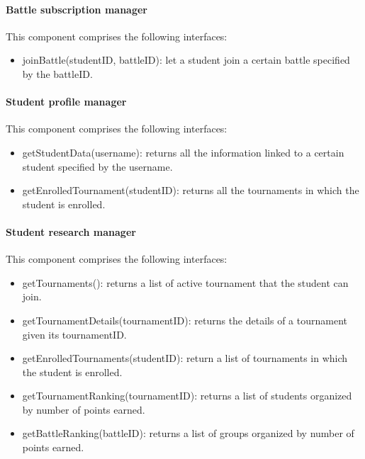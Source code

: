 \documentclass[12pt, a4paper]{report}
\begin{document}
    \paragraph*{Battle subscription manager}
    This component comprises the following interfaces: 
    \begin{itemize}
        \item joinBattle(studentID, battleID): let a student join a certain battle specified by the battleID.
    \end{itemize}

    \paragraph*{Student profile manager}
    This component comprises the following interfaces: 
    \begin{itemize}
        \item getStudentData(username): returns all the information linked to a certain student specified by the username. 
        \item getEnrolledTournament(studentID): returns all the tournaments in which the student is enrolled. 
    \end{itemize}

    \paragraph*{Student research manager}
    This component comprises the following interfaces: 
    \begin{itemize}
        \item getTournaments(): returns a list of active tournament that the student can join. 
        \item getTournamentDetails(tournamentID): returns the details of a tournament given its tournamentID. 
        \item getEnrolledTournaments(studentID): return a list of tournaments in which the student is enrolled.
        \item getTournamentRanking(tournamentID): returns a list of students organized by number of points earned. 
        \item getBattleRanking(battleID): returns a list of groups organized by number of points earned. 
    \end{itemize}
\end{document}

